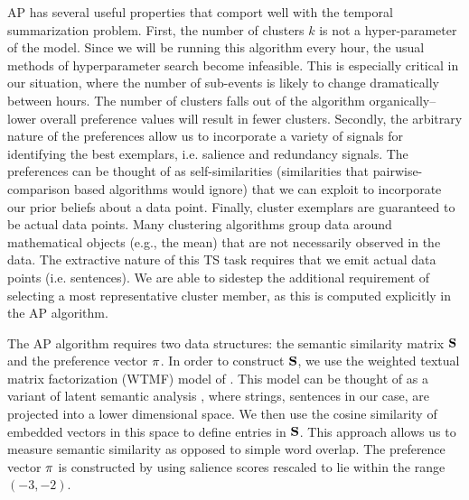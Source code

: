 AP has several useful properties that comport well with the temporal summarization problem. First, the number of clusters $k$ is not a hyper-parameter of the model. Since we will be running this algorithm every hour, the usual methods of hyperparameter search become infeasible.  This is especially critical in our situation, where the number of sub-events is likely to change dramatically between hours. The number of clusters falls out of the algorithm organically--lower overall preference values will result in fewer clusters. Secondly, the arbitrary nature of the preferences allow us to incorporate a variety of signals for identifying the best exemplars, i.e. salience and redundancy signals.  The preferences can be thought of as self-similarities (similarities that pairwise-comparison based algorithms would ignore) that we can exploit to  incorporate our prior beliefs about a data point.  Finally, cluster exemplars are guaranteed to be actual data points. Many  clustering algorithms group data around mathematical objects (e.g., the mean) that are not necessarily observed in the data. The extractive nature of this TS task requires that we emit actual data points (i.e. sentences). We are able to sidestep  the additional requirement of selecting a most representative cluster member, as this is computed explicitly in the AP  algorithm. 



%

The AP algorithm requires two data structures: the semantic similarity matrix
$\mathbf{S}$ and the preference vector $\mathbf{\pi}$.  In order to
construct $\mathbf{S}$, we use the weighted textual matrix factorization
(WTMF) model of \cite{guo2012simple}. This  model can be thought of as a
variant of latent semantic analysis \cite{deerwester:lsa},  where strings,
sentences in our case, are projected into a lower dimensional space.  We then
use the cosine similarity of embedded vectors in this space to define entries
in $\mathbf{S}$.
This approach allows us to measure semantic similarity as opposed to simple
word overlap.
The preference vector $\mathbf{\pi}$ is constructed by using salience scores rescaled to lie within the  range $(-3, -2)$.  




